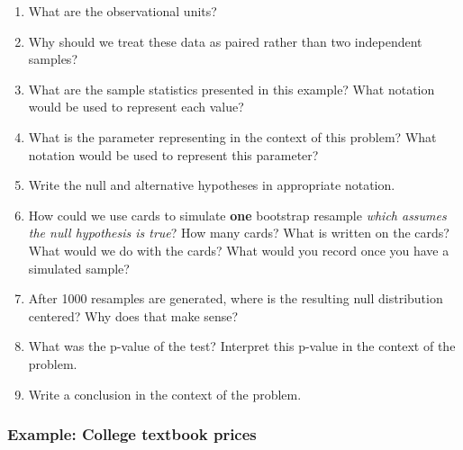 \documentclass[
]{report}
\newcommand{\rgs}{\vspace{12pt}} %
\begin{document}
\begin{enumerate}
\def\labelenumi{\arabic{enumi}.}
\item
  What are the observational units?
  \rgs
\item
  Why should we treat these data as paired rather than two independent samples?
  \rgs
\item
  What are the sample statistics presented in this example? What notation would be used to represent each value?
  \rgs
\item
  What is the parameter representing in the context of this problem? What notation would be used to represent this parameter?
  \rgs
  \rgs
\item
  Write the null and alternative hypotheses in appropriate notation.
  \rgs
\item
  How could we use cards to simulate \textbf{one} bootstrap resample \emph{which assumes the null hypothesis is true}? How many cards? What is written on the cards? What would we do with the cards? What would you record once you have a simulated sample?
  \rgs
  \rgs
  \rgs
\item
  After 1000 resamples are generated, where is the resulting null distribution centered? Why does that make sense?
  \rgs
\item
  What was the p-value of the test? Interpret this p-value in the context of the problem.
  \rgs
  \rgs
\item
  Write a conclusion in the context of the problem.
  \rgs
\end{enumerate}

\hypertarget{example-college-textbook-prices}{%
\subsubsection*{Example: College textbook prices}\label{example-college-textbook-prices}}
\end{document}
